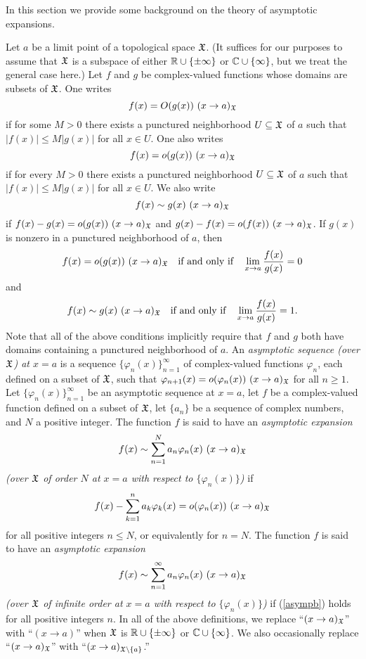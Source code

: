 \documentclass[12pt]{article}
\begin{document}
In this section we provide some background on the theory of asymptotic expansions.

Let $a$ be a limit point of a topological space ${\mathfrak X}$.  (It suffices for our purposes to assume that ${\mathfrak X}$ is a subspace of  either ${\mathbb R} \cup \{\pm \infty\}$ or ${\mathbb C} \cup \{\infty\}$, but we treat the general case here.)  Let $f$ and $g$ be complex-valued functions whose domains are subsets of ${\mathfrak X}$.  One writes $$f(x) = O(g(x)) \ (x \to a)_{\mathfrak X}$$ if for some $M > 0$ there exists a punctured neighborhood $U \subseteq {\mathfrak X}$ of $a$ such that $|f(x)| \leq M |g(x)|$ for all $x \in U$.   One also writes $$f(x) = o(g(x)) \ (x \to a)_{\mathfrak X}$$ if for every $M > 0$ there exists a punctured neighborhood $U \subseteq {\mathfrak X}$ of $a$ such that $|f(x)| \leq M |g(x)|$ for all $x \in U$.   We also write $$f(x) \sim g(x) \ (x \to a)_{\mathfrak X}$$ if $f(x) - g(x) = o(g(x))\ (x \to a)_{\mathfrak X}$ and $g(x)-f(x) = o(f(x)) \ (x \to a)_\XX$.  If $g(x)$ is nonzero in a punctured neighborhood of $a$, then 
$$f(x) = o(g(x)) \ (x \to a)_{\mathfrak X} \quad \text{if and only if} \quad \lim_{x \to a} \frac{f(x)}{g(x)} = 0$$
and
$$f(x) \sim g(x) \ (x \to a)_{\mathfrak X} \quad \text{if and only if} \quad \lim_{x \to a} \frac{f(x)}{g(x)} = 1.$$
Note that all of the above  conditions implicitly require that $f$ and $g$ both have domains containing a punctured neighborhood of $a$.   An  {\it asymptotic sequence  (over ${\mathfrak X}$) at $x = a$} is a sequence $\{\varphi_n(x)\}_{n = 1}^\infty$  of complex-valued functions $\varphi_n$,  each  defined on a subset of ${\mathfrak X}$, such that $\varphi_{n+1}(x) = o(\varphi_n(x)) \ (x \to a)_{\mathfrak X}$ for all $n \geq 1$.  Let $\{\varphi_n(x)\}_{n = 1}^\infty$ be an asymptotic sequence at $x = a$, let $f$ be a complex-valued function defined on a subset of ${\mathfrak X}$, let $\{a_n\}$ be a sequence of complex numbers, and $N$ a positive integer.  The function $f$ is said to have an {\it asymptotic expansion
\begin{align}\label{asympa}
f(x) \sim \sum_{n=1}^{N} a_n \varphi_{n}(x) \ (x \to a)_{\mathfrak X}
\end{align}
(over ${\mathfrak X}$ of order $N$ at $x = a$ with respect to $\{\varphi_n(x)\}$)} if
\begin{align}\label{asympb}
f(x) - \sum_{k=1}^{n} a_k \varphi_{k}(x) = o(\varphi_{n}(x)) \  (x \to a)_{\mathfrak X}
\end{align}
for all positive integers $n \leq N$, or equivalently for $n = N$.  The function $f$ is said to have an {\it asymptotic expansion
$$f(x) \sim \sum_{n=1}^{\infty} a_n \varphi_{n}(x) \ (x \to a)_{\mathfrak X}$$
(over ${\mathfrak X}$ of infinite order at $x = a$ with respect to $\{\varphi_n(x)\}$)} if (\ref{asympb}) holds for all positive integers $n$.  In all of the above definitions, we replace ``$(x \to a)_{\mathfrak X}$'' with ``$(x \to a)$'' when ${\mathfrak X}$ is ${\mathbb R} \cup \{\pm \infty\}$ or ${\mathbb C} \cup \{\infty \}$.   We also occasionally replace ``$(x \to a)_{\mathfrak X}$'' with ``$(x \to a)_{{\mathfrak X}\backslash \{a\}}$.''
\end{document}
